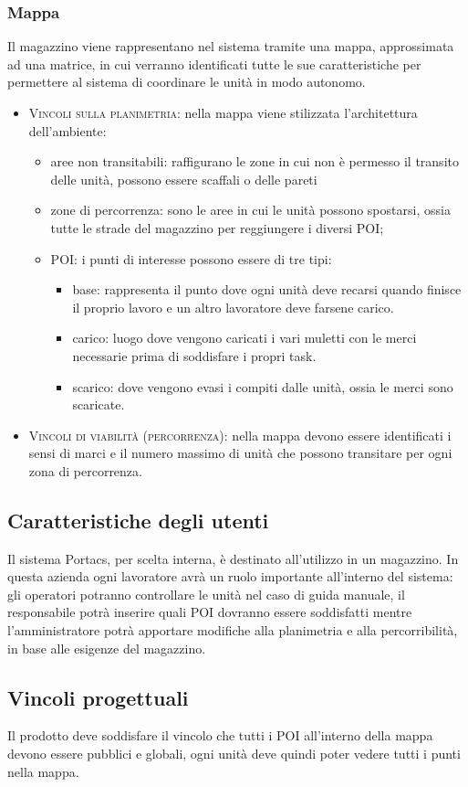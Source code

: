 \subsubsection{Mappa}
Il magazzino viene rappresentano nel sistema tramite una mappa, approssimata ad una matrice, in cui verranno identificati tutte le sue caratteristiche per permettere al sistema di coordinare le unità in modo autonomo.
\begin{itemize}
	\item \textsc{Vincoli sulla planimetria:} nella mappa viene stilizzata l'architettura dell'ambiente:
	\begin{itemize}
		\item aree non transitabili: raffigurano le zone in cui non è permesso il transito delle unità, possono essere scaffali o delle pareti
		\item zone di percorrenza: sono le aree in cui le unità possono spostarsi, ossia tutte le strade del magazzino per reggiungere i diversi POI;
		\item POI: i punti di interesse possono essere di tre tipi:
		\begin{itemize}
			\item base: rappresenta il punto dove ogni unità deve recarsi quando finisce il proprio lavoro e un altro lavoratore deve farsene carico.
			\item carico: luogo dove vengono caricati i vari muletti con le merci necessarie prima di soddisfare i propri task.
			\item scarico: dove vengono evasi i compiti dalle unità, ossia le merci sono scaricate.
		\end{itemize}
	\end{itemize}
	\item \textsc{Vincoli di viabilità (percorrenza):} nella mappa devono essere identificati i sensi di marci e il numero massimo di unità che possono transitare per ogni zona di percorrenza.
	
\end{itemize}

\subsection{Caratteristiche degli utenti}
Il sistema Portacs, per scelta interna, è destinato all'utilizzo in un magazzino. In questa azienda ogni lavoratore avrà un ruolo importante all'interno del sistema: gli operatori potranno controllare le unità nel caso di guida manuale, il responsabile potrà inserire quali POI dovranno essere soddisfatti mentre l'amministratore potrà apportare modifiche alla planimetria e alla percorribilità, in base alle esigenze del magazzino.
\subsection{Vincoli progettuali}
Il prodotto deve soddisfare il vincolo che tutti i POI all'interno della mappa devono essere pubblici e globali, ogni unità deve quindi poter vedere tutti i punti nella mappa.